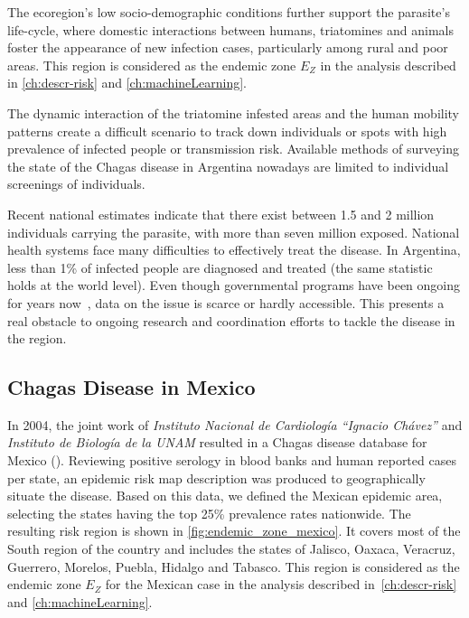 The ecoregion's low socio-demographic conditions further support the parasite's life-cycle, where domestic interactions between humans, triatomines and animals foster the appearance of new infection cases, particularly among rural and poor areas.
This region is considered as the endemic zone $E_Z$ in the analysis described in \cref{ch:descr-risk} and \cref{ch:machineLearning}.



The dynamic interaction of the triatomine infested areas and the human mobility patterns create a difficult scenario to track down individuals or spots with high prevalence of infected people or transmission risk. Available methods of surveying the state of the Chagas disease in Argentina nowadays are limited to individual screenings of individuals. %

Recent national estimates indicate that there exist between 1.5 and 2 million individuals carrying the parasite, with more than seven million exposed. National health systems face many difficulties to effectively treat the disease.
In Argentina, less than 1\% of infected people are diagnosed and treated
(the same statistic holds at the world level).
Even though governmental programs have been ongoing for years now~\cite{plan_nacional_chagas}, data on the issue is scarce or hardly accessible. This presents a real obstacle to ongoing research and coordination efforts to tackle the disease in the region.


\subsection{Chagas Disease in  Mexico}\label{endemic_zone_mexico}



In 2004, the joint work of \textit{Instituto Nacional de Cardiología ``Ignacio Chávez''} and  \textit{Instituto de Biología de la UNAM} resulted in a Chagas disease database for Mexico (\cite{cruz2006chagmex}). Reviewing positive serology in blood banks and human reported cases per state, an epidemic risk map description was produced to geographically situate the disease. Based on this data, we defined the Mexican epidemic area, selecting the states having the top 25\% prevalence rates nationwide. The resulting risk region is shown in \cref{fig:endemic_zone_mexico}. It covers most of the South region of the country and includes the states of Jalisco, Oaxaca, Veracruz, Guerrero, Morelos, Puebla, Hidalgo and Tabasco.
This region is considered as the endemic zone $E_Z$ for the Mexican case in the analysis described in~\cref{ch:descr-risk} and \cref{ch:machineLearning}.


